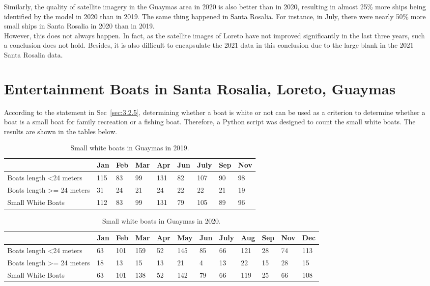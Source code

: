 Similarly, the quality of satellite imagery in the Guaymas area in 2020 is also better than in 2020, resulting in almost 25\% more ships being identified by the model in 2020 than in 2019. The same thing happened in Santa Rosalia. For instance, in July, there were nearly 50\% more small ships in Santa Rosalia in 2020 than in 2019. \\

However, this does not always happen. In fact, as the satellite images of Loreto have not improved significantly in the last three years, such a conclusion does not hold. Besides, it is also difficult to encapsulate the 2021 data in this conclusion due to the large blank in the 2021 Santa Rosalia data.



\section{Entertainment Boats in Santa Rosalia, Loreto, Guaymas}
According to the statement in Sec~\ref{sec:3.2.5}, determining whether a boat is white or not can be used as a criterion to determine whether a boat is a small boat for family recreation or a fishing boat. Therefore, a Python script was designed to count the small white boats. The results are shown in the tables below.\\



\begin{table}[h!]
\begin{tabular}{|l|l|l|l|l|l|l|l|l|}
\hline
                                       & Jan & Feb & Mar & Apr & Jun & July & Sep & Nov \\ \hline
Boats length \textless 24 meters       & 115 & 83  & 99  & 131 & 82  & 107  & 90  & 98  \\ \hline
Boats length \textgreater{}= 24 meters & 31  & 24  & 21  & 24  & 22  & 22   & 21  & 19  \\ \hline
Small White Boats                      & 112 & 83  & 99  & 131 & 79  & 105  & 89  & 96  \\ \hline
\end{tabular}
\caption{Small white boats in Guaymas in 2019.}
\end{table}


\begin{table}[h!]
\begin{tabular}{|l|l|l|l|l|l|l|l|l|l|l|l|}
\hline
                                       & Jan & Feb & Mar & Apr & May & Jun & July & Aug & Sep & Nov & Dec \\ \hline
Boats length \textless 24 meters       & 63  & 101 & 159 & 52  & 145 & 85  & 66   & 121 & 28  & 74  & 113 \\ \hline
Boats length \textgreater{}= 24 meters & 18  & 13  & 15  & 13  & 21  & 4   & 13   & 22  & 15  & 28  & 15  \\ \hline
Small White Boats                      & 63  & 101 & 138 & 52  & 142 & 79  & 66   & 119 & 25  & 66  & 108 \\ \hline
\end{tabular}
\caption{Small white boats in Guaymas in 2020.}
\end{table}



